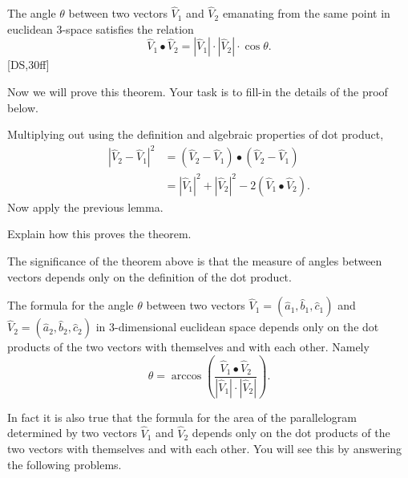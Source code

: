 \documentclass{ximera}
\begin{document}
\begin{theorem}
\label{111}The angle $\theta$ between two vectors $\hat{V}_{1}$ and
$\hat{V}_{2}$ emanating from the same point in euclidean $3$-space satisfies
the relation
\begin{equation}
\hat{V}_{1}\bullet\hat{V}_{2}=\left\vert \hat{V}_{1}\right\vert \cdot
\left\vert \hat{V}_{2}\right\vert \cdot\cos\theta. \label{2}%
\end{equation}
[DS,30ff]
\end{theorem}

Now we will prove this theorem. Your task is to fill-in the details of
the proof below.

\begin{problem}
Multiplying out using the definition and algebraic properties of dot product,%
\begin{align*}
\left\vert \hat{V}_{2}-\hat{V}_{1}\right\vert ^{2}  &  =\left(  \hat{V}%
_{2}-\hat{V}_{1}\right)  \bullet\left(  \hat{V}_{2}-\hat{V}_{1}\right) \\
&  =\left\vert \hat{V}_{1}\right\vert ^{2}+\left\vert \hat{V}_{2}\right\vert
^{2}-2\left(  \hat{V}_{1}\bullet\hat{V}_{2}\right)  .
\end{align*}
Now apply the previous lemma.

Explain how this proves the theorem. 
\end{problem}

The significance of the theorem above is that the measure of angles between
vectors depends only on the definition of the dot product.

\begin{corollary}
The formula for the angle $\theta$ between two vectors $\hat{V}_{1}=\left(
\hat{a}_{1},\hat{b}_{1},\hat{c}_{1}\right)  $ and $\hat{V}_{2}=\left(  \hat
{a}_{2},\hat{b}_{2},\hat{c}_{2}\right)  $ in $3$-dimensional euclidean space
depends only on the dot products of the two vectors with themselves and with
each other. Namely%
\[
\theta=\arccos\left(  \frac{\hat{V}_{1}\bullet\hat{V}_{2}%
}{\left\vert \hat{V}_{1}\right\vert \cdot\left\vert \hat{V}_{2}\right\vert
}\right)  .
\]

\end{corollary}

In fact it is also true that the formula for the area of the parallelogram
determined by two vectors $\hat{V}_{1}$ and $\hat{V}_{2}$ depends only on the
dot products of the two vectors with themselves and with each other. You will
see this by answering the following problems.
\end{document}
